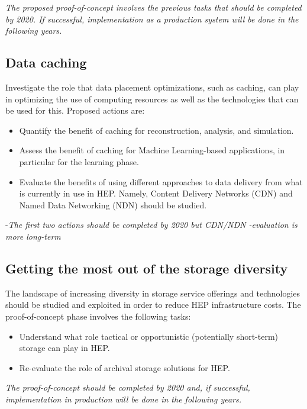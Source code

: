 \documentclass[12pt,a4paper]{article}
\begin{document}
\emph{The proposed proof-of-concept involves the previous tasks that should be completed by 2020.
If successful, implementation as a production system will be done in the following years.}

\subsection{Data caching}\label{data-caching}
Investigate the role that data placement optimizations, such as caching, can play in optimizing
the use of computing resources as well as the technologies that can be used for this. Proposed actions are:

\begin{itemize}
\item Quantify the benefit of caching for reconstruction, analysis, and simulation.
\item Assess the benefit of caching for
  Machine Learning-based applications, in particular for the learning
  phase.
\item Evaluate the benefits of using different approaches to data delivery from what is currently in use in HEP.
Namely, Content Delivery Networks (CDN) and Named Data Networking (NDN) should be studied.
\end{itemize}

-\emph{The first two actions should be completed by 2020 but CDN/NDN
-evaluation is more long-term}

\subsection{Getting the most out of the
storage diversity}\label{storage-diversity}

The landscape of increasing diversity in storage service offerings and technologies should be studied and
exploited in order to reduce HEP infrastructure costs. The proof-of-concept phase involves the following tasks:

\begin{itemize}
\item Understand what role tactical or opportunistic (potentially short-term) storage can play in HEP.
\item Re-evaluate the role of archival storage solutions for HEP.
\end{itemize}

\emph{The  proof-of-concept should be completed by 2020 and, if successful, implementation in
production will be done in the following years.}
\end{document}
